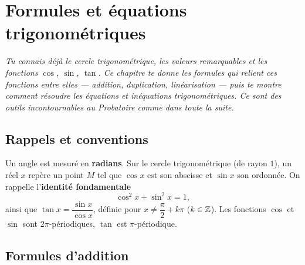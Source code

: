 \chapter{Formules et équations trigonométriques}
\textit{Tu connais déjà le cercle trigonométrique, les valeurs remarquables et les
fonctions $\cos$, $\sin$, $\tan$. Ce chapitre te donne les \emph{formules} qui
relient ces fonctions entre elles — addition, duplication, linéarisation — puis te
montre comment résoudre les \emph{équations} et \emph{inéquations} trigonométriques.
Ce sont des outils incontournables au Probatoire comme dans toute la suite.}

\section{Rappels et conventions}

\begin{aretenir}
Un angle est mesuré en \textbf{radians}. Sur le cercle trigonométrique (de rayon
$1$), un réel $x$ repère un point $M$ tel que $\cos x$ est son abscisse et $\sin x$
son ordonnée. On rappelle l'\textbf{identité fondamentale}
\[ \cos^2 x+\sin^2 x=1, \]
ainsi que $\tan x=\dfrac{\sin x}{\cos x}$, définie pour $x\neq \dfrac{\pi}{2}+k\pi$
($k\in\mathbb{Z}$). Les fonctions $\cos$ et $\sin$ sont $2\pi$-périodiques, $\tan$ est
$\pi$-périodique.
\end{aretenir}

\begin{illus}
\end{illus}

\section{Formules d'addition}

